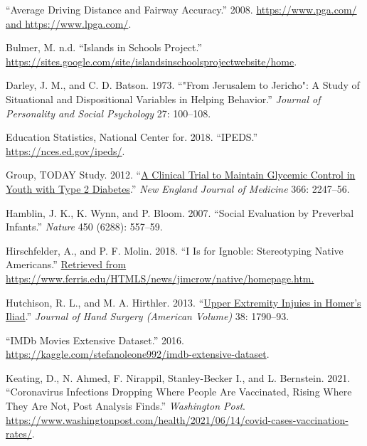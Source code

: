 \documentclass[
]{report}
\newlength{\cslhangindent}
\newlength{\cslentryspacingunit} %
\newenvironment{CSLReferences}[2] %
 {%
  \setlength{\parindent}{0pt}
  \ifodd #1
  \let\oldpar\par
  \def\par{\hangindent=\cslhangindent\oldpar}
  \fi
  \setlength{\parskip}{#2\cslentryspacingunit}
 }%
 {}
\begin{document}
\hypertarget{refs}{}
\begin{CSLReferences}{1}{0}
\leavevmode{}%
{``Average Driving Distance and Fairway Accuracy.''} 2008. \href{https://www.pga.com/\%20and\%20https://www.lpga.com/}{https://www.pga.com/ and https://www.lpga.com/}.

\leavevmode{}%
Bulmer, M. n.d. {``Islands in Schools Project.''} \url{https://sites.google.com/site/islandsinschoolsprojectwebsite/home}.

\leavevmode{}%
Darley, J. M., and C. D. Batson. 1973. {``"From Jerusalem to Jericho": A Study of Situational and Dispositional Variables in Helping Behavior.''} \emph{Journal of Personality and Social Psychology} 27: 100--108.

\leavevmode{}%
Education Statistics, National Center for. 2018. {``IPEDS.''} \url{https://nces.ed.gov/ipeds/}.

\leavevmode{}%
Group, TODAY Study. 2012. {``\href{https://www.ncbi.nlm.nih.gov/pubmed/22540912}{A Clinical Trial to Maintain Glycemic Control in Youth with Type 2 Diabetes}.''} \emph{New England Journal of Medicine} 366: 2247--56.

\leavevmode{}%
Hamblin, J. K., K. Wynn, and P. Bloom. 2007. {``Social Evaluation by Preverbal Infants.''} \emph{Nature} 450 (6288): 557--59.

\leavevmode{}%
Hirschfelder, A., and P. F. Molin. 2018. {``I Is for Ignoble: Stereotyping Native Americans.''} \href{Retrieved\%20from\%20https://www.ferris.edu/HTMLS/news/jimcrow/native/homepage.htm.}{Retrieved from https://www.ferris.edu/HTMLS/news/jimcrow/native/homepage.htm.}

\leavevmode{}%
Hutchison, R. L., and M. A. Hirthler. 2013. {``\href{https://www.ncbi.nlm.nih.gov/pubmed/23932117}{Upper Extremity Injuies in Homer's Iliad}.''} \emph{Journal of Hand Surgery (American Volume)} 38: 1790--93.

\leavevmode{}%
{``{IMDb} Movies Extensive Dataset.''} 2016. \url{https://kaggle.com/stefanoleone992/imdb-extensive-dataset}.

\leavevmode{}%
Keating, D., N. Ahmed, F. Nirappil, Stanley-Becker I., and L. Bernstein. 2021. {``Coronavirus Infections Dropping Where People Are Vaccinated, Rising Where They Are Not, Post Analysis Finds.''} \emph{Washington Post}. \url{https://www.washingtonpost.com/health/2021/06/14/covid-cases-vaccination-rates/}.


\end{CSLReferences}
\end{document}
